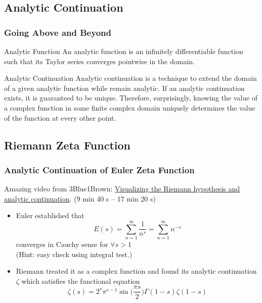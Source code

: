 \documentclass{beamer}
\begin{document}

\subsection{Analytic Continuation}

\begin{frame}
\frametitle{Going Above and Beyond}

\begin{block}{Analytic Function}
An analytic function is an infinitely differentiable function such that its Taylor series converges pointwise in the domain. 
\end{block}

\begin{block}{Analytic Continuation}
Analytic continuation is a technique to extend the domain of a given analytic function while remain analytic. If an analytic continuation exists, it is guaranteed to be unique. Therefore, surprisingly, knowing the value of a complex function in some finite complex domain uniquely determines the value of the function at every other point.
\end{block}

\end{frame}


\subsection{Riemann Zeta Function}

\begin{frame}
\frametitle{Analytic Continuation of Euler Zeta Function}

Amazing video from 3Blue1Brown: \href{https://www.youtube.com/watch?v=sD0NjbwqlYw}{Visualizing the Riemann hypothesis and analytic continuation}. (9 min 40 s -- 17 min 20 s) \\ 

\begin{itemize}
    \item Euler established that 
    $$ E(s) = \sum_{n=1}^{\infty} \frac{1}{n^s} = \sum_{n=1}^{\infty} n^{-s} $$
    converges in Cauchy sense for $ \forall s > 1 $ \\ 
    (Hint: easy check using integral test.)
    \item Riemann treated it as a complex function and found its analytic continuation $\zeta$ which satisfies the functional equation 
    $$ \zeta(s) = 2^s \pi^{s-1} \sin \big( \frac{\pi s}{2} \big) \Gamma (1-s) \zeta(1-s) $$
\end{itemize}

\end{frame}
\end{document}
